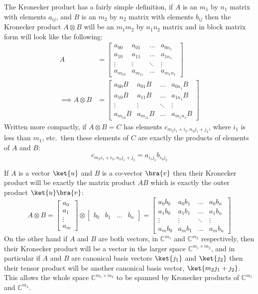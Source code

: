 The Kronecker product has a fairly simple definition, if $A$ is an $m_1$ by $n_1$ matrix with elements $a_{ij}$, and $B$ is an $m_2$ by $n_2$ matrix with elements $b_{ij}$ then the Kronecker product $A \otimes B$ will be an $m_1m_2$ by $n_1n_2$ matrix and in block matrix form will look like the following:
\begin{align*}
	A &= \left[\begin{matrix}
		a_{00} & a_{01} & \dots & a_{0n_1}\\
		a_{10} & a_{11} & \dots & a_{1n_1}\\
		\vdots & \vdots & \ddots & \vdots\\
		a_{m_10} & a_{m_11} & \dots & a_{m_1n_1}
	\end{matrix}\right]
	\\\implies A\otimes B &= \left[\begin{matrix}
		a_{00}B & a_{01}B & \dots & a_{0n_1}B\\
		a_{10}B & a_{11}B & \dots & a_{1n_1}B\\
		\vdots & \vdots & \ddots & \vdots\\
		a_{m_10}B & a_{m_11}B & \dots & a_{m_1n_1}B
	\end{matrix}\right]
\end{align*}
Written more compactly, if $A\otimes B = C$ has elements $c_{m_2i_1 + i_2,n_2j_1+j_2}$, where $i_1$ is less than $m_1$, etc.\ then these elements of $C$ are exactly the products of elements of $A$ and $B$:
\[c_{m_2i_1 + i_2,n_2j_1+j_2} = a_{i_1j_1}b_{i_2j_2}\]

If $A$ is a vector $\ket{u}$ and $B$ is a co-vector $\bra{v}$ then their Kronecker product will be exactly the matrix product $AB$ which is exactly the outer product $\ket{u}\bra{v}$:
\[
A \otimes B =
\left[\begin{matrix}
	a_0\\a_1\\\vdots\\a_m
\end{matrix}\right]
\otimes
\left[\begin{matrix}
	b_0&b_1&\dots&b_n
\end{matrix}\right]
=
\left[\begin{matrix}
	a_0b_0 & a_0b_1 & \dots & a_0b_n\\
	a_1b_0 & a_1b_1 & \dots & a_1b_n\\
	\vdots & \vdots & \ddots & \vdots\\
	a_mb_0 & a_mb_1 & \dots & a_mb_n
\end{matrix}\right]
\]
On the other hand if $A$ and $B$ are both vectors, in $\mathbb{C}^{m_1}$ and $\mathbb{C}^{m_2}$ respectively, then their Kronecker product will be a vector in the larger space $\mathbb{C}^{m_1\times m_2}$, and in particular if $A$ and $B$ are canonical basis vectors $\ket{j_1}$ and $\ket{j_2}$ then their tensor product will be another canonical basis vector, $\ket{m_2j_1 + j_2}$. This allows the whole space $\mathbb{C}^{m_1 \times m_2}$ to be spanned by Kronecker products of $\mathbb{C}^{m_1}$ and $\mathbb{C}^{m_2}$.

